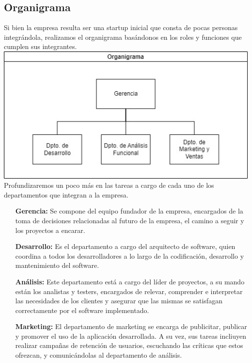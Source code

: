 \documentclass[a4paper,12pt]{article}
\begin{document}
    \subsection{Organigrama}
    Si bien la empresa resulta ser una startup inicial que consta de pocas personas integrándola, realizamos el organigrama basándonos en los roles y funciones que cumplen sus integrantes.\newline
    \includegraphics[width=1\textwidth]{Imagenes/Organigrama.jpg}\newline
    Profundizaremos un poco más en las tareas a cargo de cada uno de los departamentos que integran a la empresa.
    \begin{itemize}
        \item[\textbf{Gerencia:}] Se compone del equipo fundador de la empresa, encargados de la toma de decisiones relacionadas al futuro de la empresa, el camino a seguir y los proyectos a encarar.
        \item[\textbf{Desarrollo:}] Es el departamento a cargo del arquitecto de software, quien coordina a todos los desarrolladores a lo largo de la codificación, desarrollo y mantenimiento del software.
        \item[\textbf{Análisis:}] Este departamento está a cargo del líder de proyectos, a su mando están los analistas y testers, encargados de relevar, comprender e interpretar las necesidades de los clientes y asegurar que las mismas se satisfagan correctamente por el software implementado.
        \item[\textbf{Marketing:}] El departamento de marketing se encarga de publicitar, publicar y promover el uso de la aplicación desarrollada. A su vez, sus tareas incliuyen realizar campañas de retención de usuarios, escuchando las críticas que estos ofrezcan, y comunicándolas al departamento de análisis. 
    \end{itemize}
\end{document}
